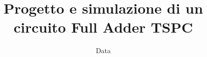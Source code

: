 \documentclass[a4paper, 12pt, oneside]{Thesis}  %
\begin{document}
\frontmatter	  %

%
%

\title  {Progetto e simulazione di un circuito Full Adder TSPC}

\date{Data}
       
\maketitle


\fancyhead{}  %
\rhead{\thepage}  %
\lhead{}  %

\pagestyle{fancy}  %

%
%


\pagestyle{empty}  %

\clearpage  %

\pagestyle{fancy}  %

%
%

\tableofcontents  %

\end{document}
